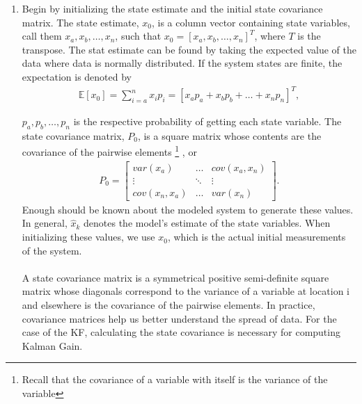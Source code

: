 \begin{enumerate}
  \item Begin by initializing the state estimate and the initial state covariance matrix. The state estimate, $x_0$,  is a  column vector containing state variables, call them $x_a, x_b, \hdots, x_n$, such that $x_0= [x_a, x_b, \hdots, x_n]^T$, where $T$ is the transpose. The stat estimate can be found by taking the expected value of the data where data is normally distributed. If the system states are finite, the expectation is denoted by
    \begin{align*}
        \mathbb{E}[x_0]   = \sum^n_{i = a} x_i p_i = [x_a p_a + x_b p_b + \hdots + x_n p_n]^T,
    \end{align*}
    
    $p_a, p_b, \hdots, p_n$ is the respective probability of getting each state variable.    The state covariance matrix, $P_0$, is a square matrix whose contents are the covariance of the pairwise elements
    \footnote{Recall that the covariance of a variable with itself is the variance of the variable}
    , or
    \begin{align*}
      P_0 =
      \begin{bmatrix}
           var(x_a)  & \hdots & cov(x_a,x_n) \\
           \vdots & \ddots & \vdots \\
           cov(x_n, x_a)  & \hdots & var(x_n )
         \end{bmatrix} .
  \end{align*}
  Enough should be known about the modeled system to generate these values. In general, $\hat x_k$ denotes the model's estimate of the state variables. When initializing these values, we use $x_0$, which is the actual initial measurements of the system. \\ \\
   A state covariance matrix is a symmetrical positive semi-definite square matrix whose diagonals correspond to the variance of a variable at location i and elsewhere is the covariance of the pairwise elements. In practice, covariance matrices help us better understand the spread of data. For the case of the KF, calculating the state covariance is necessary for computing Kalman Gain. 
   

\end{enumerate}
